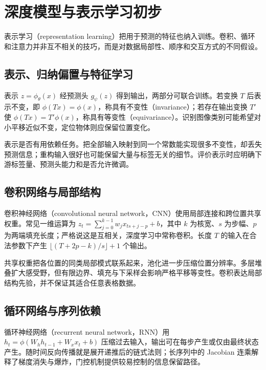 \setcounter{chapter}{17} %
\chapter{深度模型与表示学习初步}
\label{chap:ml-representation}

表示学习（representation learning）把用于预测的特征也纳入训练。卷积、循环和注意力并非互不相关的技巧，而是对数据局部性、顺序和交互方式的不同假设。

\section{表示、归纳偏置与特征学习}

表示 $z=\phi_\theta(x)$ 经预测头 $g_\psi(z)$ 得到输出，两部分可联合训练。若变换 $T$ 后表示不变，即 $\phi(Tx)=\phi(x)$，称具有不变性（invariance）；若存在输出变换 $T'$ 使 $\phi(Tx)=T'\phi(x)$，称具有等变性（equivariance）。识别图像类别可能希望对小平移近似不变，定位物体则应保留位置变化。

表示是否有用依赖任务。把全部输入映射到同一个常数能实现很多不变性，却丢失预测信息；重构输入很好也可能保留大量与标签无关的细节。评价表示时应明确下游标签量、预测头能力和是否允许微调。

\section{卷积网络与局部结构}

卷积神经网络（convolutional neural network，CNN）使用局部连接和跨位置共享权重。常见一维运算为 $z_t=\sum_{j=0}^{k-1}w_jx_{ts+j-p}+b$，其中 $k$ 为核宽、$s$ 为步幅、$p$ 为两端填充长度；严格说这是互相关，深度学习中常称卷积。长度 $T$ 的输入在合法参数下产生 $\lfloor(T+2p-k)/s\rfloor+1$ 个输出。

共享权重把各位置的同类局部模式联系起来，池化进一步压缩位置分辨率。多层堆叠扩大感受野，但有限边界、填充与下采样会影响严格平移等变性。卷积表达局部结构先验，并不保证其适合任意表格数据。

\section{循环网络与序列依赖}

循环神经网络（recurrent neural network，RNN）用 $h_t=\phi(W_hh_{t-1}+W_xx_t+b)$ 压缩过去输入，输出可在每步产生或仅由最终状态产生。随时间反向传播就是展开递推后的链式法则；长序列中的 Jacobian 连乘解释了梯度消失与爆炸，门控机制提供较易控制的信息保留路径。


